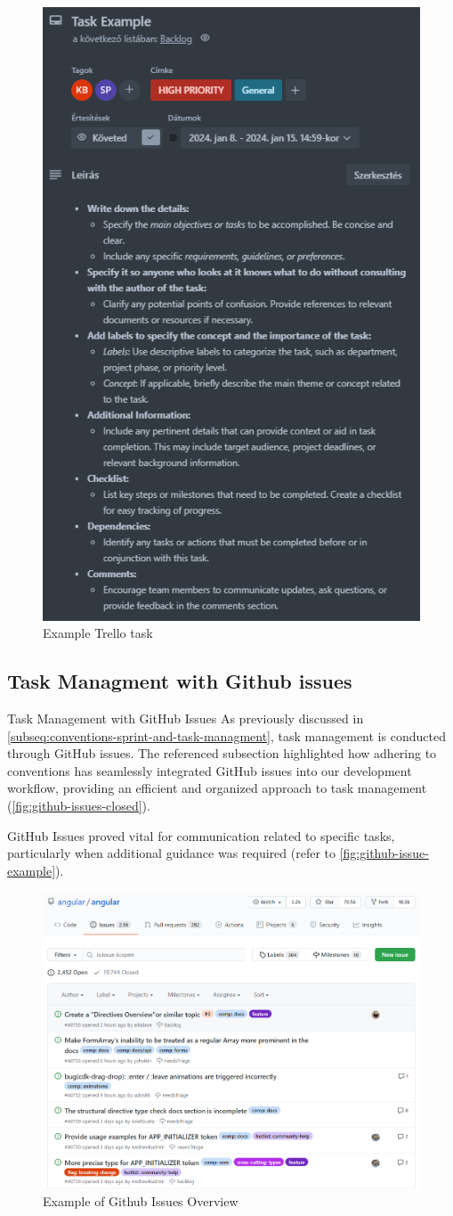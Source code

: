 \documentclass[12pt,a4paper]{article}
\begin{document}
\begin{spacing}{1.5}
    \begin{figure}[H]
        \centering
        \includegraphics[width=0.3\linewidth]{assets/trello-task-example.png}
        \caption{Example Trello task}
        \label{fig:trello-task-example}%
    \end{figure}
    \FloatBarrier

    \subsection{Task Managment with Github issues}\label{subseq:task-managment-github-issue}

    Task Management with GitHub Issues As previously discussed in
    \autoref{subseq:conventions-sprint-and-task-managment}, task management is
    conducted through GitHub issues. The referenced subsection highlighted how
    adhering to conventions has seamlessly integrated GitHub issues into our
    development workflow, providing an efficient and organized approach to task
    management (\autoref{fig:github-issues-closed}).

    GitHub Issues proved vital for communication related to specific tasks,
    particularly when additional guidance was required (refer to
    \autoref{fig:github-issue-example}).

    \begin{figure}[h]
        \centering
        \includegraphics[width=16cm]{assets/github-issue-overview-example.png}
        \caption{Example of Github Issues Overview}
        \label{fig:github-issues-closed}
    \end{figure}
    \FloatBarrier


\end{spacing}
\end{document}

